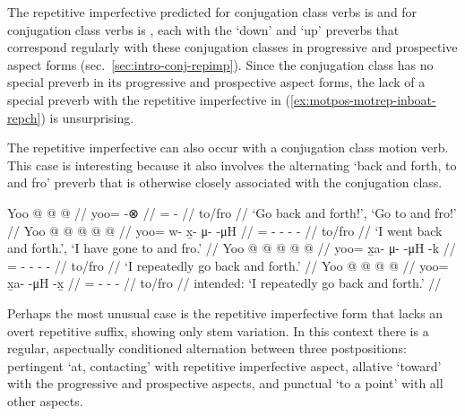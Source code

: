 \documentclass[12pt,letterpaper,oneside,article]{memoir}
\begin{document}
The repetitive imperfective predicted for  conjugation class verbs is  and for  conjugation class verbs is , each with the  ‘down’ and  ‘up’ preverbs that correspond regularly with these conjugation classes in progressive and prospective aspect forms (sec.\ \ref{sec:intro-conj-repimp}).
Since the  conjugation class has no special preverb in its progressive and prospective aspect forms, the lack of a special preverb with the repetitive imperfective in (\ref{ex:motpos-motrep-inboat-repch}) is unsurprising.

The  repetitive imperfective can also occur with a  conjugation class motion verb.
This case is interesting because it also involves the alternating  ‘back and forth, to and fro’ preverb that is otherwise closely associated with the  conjugation class.

\pex\label{ex:motpos-motrep-alt}%
\a\label{ex:motpos-motrep-alt-imp}%
%
\begingl
	\gla	Yoo @  @ {} @ {} //
	\glb	yoo= {}  -⊗ //
	\glc	{}= \·  - //
	\gld	to/fro\·  {} {} //
	\glft	‘Go back and forth!’, ‘Go to and fro!’
		//
\endgl
\a\label{ex:motpos-motrep-alt-pfv}%
%
\begingl
	\gla	Yoo @  @ {} @ {} @ {} @ {} //
	\glb	yoo= w- x̱- μ-  -μH //
	\glc	{}= - - -  - //
	\gld	to/fro\·  {} {} {} {} //
	\glft	‘I went back and forth.’, ‘I have gone to and fro.’
		//
\endgl
\a\label{ex:motpos-motrep-alt-repch}%
%
\begingl
	\gla	Yoo @  @ {} @ {} @ {} @ {} //
	\glb	yoo= x̱a- μ-  -μH -k //
	\glc	{}= - -  - - //
	\gld	to/fro\·  {} {} {} //
	\glft	‘I repeatedly go back and forth.’
		//
\endgl
\a\label{ex:motpos-motrep-alt-repxh}%
\ljudge{*}%
%
\begingl
	\gla	Yoo @  @ {} @ {} @ {} //
	\glb	yoo= x̱a-  -μH -x̱ //
	\glc	{}= -  - - //
	\gld	to/fro\·  {} {} {} //
	\glft	intended: ‘I repeatedly go back and forth.’
		//
\endgl
\xe

Perhaps the most unusual case is the repetitive imperfective form that lacks an overt repetitive suffix, showing only  stem variation.
In this context there is a regular, aspectually conditioned alternation between three postpositions: pertingent  ‘at, contacting’ with repetitive imperfective aspect, allative  ‘toward’ with the progressive and prospective aspects, and punctual  ‘to a point’ with all other aspects.
\end{document}
